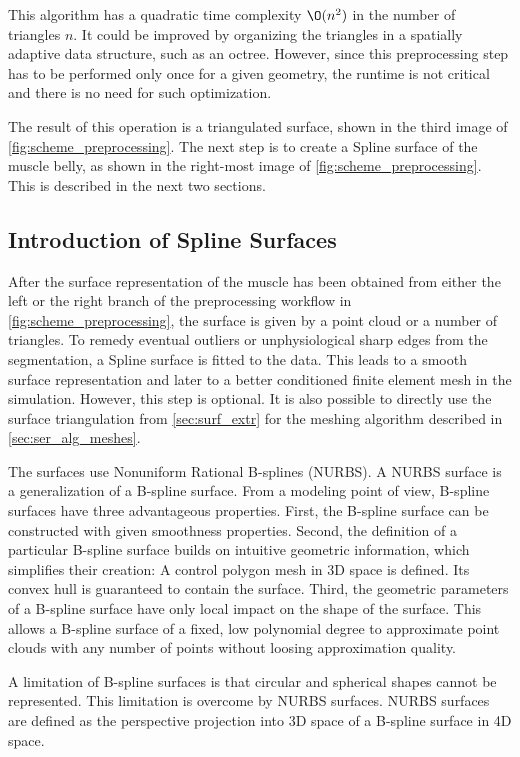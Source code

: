 This algorithm has a quadratic time complexity $\O(n^2)$ in the number of triangles $n$. It could be improved by organizing the triangles in a spatially adaptive data structure, such as an octree. However, since this preprocessing step has to be performed only once for a given geometry, the runtime is not critical and there is no need for such optimization.

The result of this operation is a triangulated surface, shown in the third image of \cref{fig:scheme_preprocessing}. The next step is to create a Spline surface of the muscle belly, as shown in the right-most image of \cref{fig:scheme_preprocessing}. This is described in the next two sections.

\subsection{Introduction of Spline Surfaces}\label{sec:nurbs}
After the surface representation of the muscle has been obtained from either the left or the right branch of the preprocessing workflow in \cref{fig:scheme_preprocessing}, the surface is given by a point cloud or a number of triangles. To remedy eventual outliers or unphysiological sharp edges from the segmentation, a Spline surface is fitted to the data. This leads to a smooth surface representation and later to a better conditioned finite element mesh in the simulation. However, this step is optional. It is also possible to directly use the surface triangulation from \cref{sec:surf_extr} for the meshing algorithm described in \cref{sec:ser_alg_meshes}.

The surfaces use Nonuniform Rational B-splines (NURBS). A NURBS surface is a generalization of a B-spline surface. From a modeling point of view, B-spline surfaces have three advantageous properties.
First, the B-spline surface can be constructed with given smoothness properties.  
Second, the definition of a particular B-spline surface builds on intuitive geometric information, which simplifies their creation: A control polygon mesh in 3D space is defined. Its convex hull is guaranteed to contain the surface.
Third, the geometric parameters of a B-spline surface have only local impact on the shape of the surface. This allows a B-spline surface of a fixed, low polynomial degree to approximate point clouds with any number of points without loosing approximation quality.

A limitation of B-spline surfaces is that circular and spherical shapes cannot be represented. This limitation is overcome by NURBS surfaces. NURBS surfaces are defined as the perspective projection into 3D space of a B-spline surface in 4D space.

